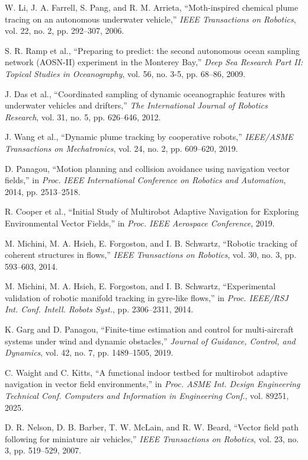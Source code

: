  W. Li, J. A. Farrell, S. Pang, and R. M. Arrieta, ``Moth-inspired chemical plume tracing on an autonomous underwater vehicle,'' \textit{IEEE Transactions on Robotics}, vol. 22, no. 2, pp. 292--307, 2006.

 S. R. Ramp et al., ``Preparing to predict: the second autonomous ocean sampling network (AOSN-II) experiment in the Monterey Bay,'' \textit{Deep Sea Research Part II: Topical Studies in Oceanography}, vol. 56, no. 3-5, pp. 68--86, 2009.

 J. Das et al., ``Coordinated sampling of dynamic oceanographic features with underwater vehicles and drifters,'' \textit{The International Journal of Robotics Research}, vol. 31, no. 5, pp. 626--646, 2012.

 J. Wang et al., ``Dynamic plume tracking by cooperative robots,'' \textit{IEEE/ASME Transactions on Mechatronics}, vol. 24, no. 2, pp. 609--620, 2019.

 D. Panagou, ``Motion planning and collision avoidance using navigation vector fields,'' in \textit{Proc. IEEE International Conference on Robotics and Automation}, 2014, pp. 2513--2518.

 R. Cooper et al., ``Initial Study of Multirobot Adaptive Navigation for Exploring Environmental Vector Fields,'' in \textit{Proc. IEEE Aerospace Conference}, 2019.

 M. Michini, M. A. Hsieh, E. Forgoston, and I. B. Schwartz, ``Robotic tracking of coherent structures in flows,'' \textit{IEEE Transactions on Robotics}, vol. 30, no. 3, pp. 593--603, 2014.

 M. Michini, M. A. Hsieh, E. Forgoston, and I. B. Schwartz, ``Experimental validation of robotic manifold tracking in gyre-like flows,'' in \textit{Proc. IEEE/RSJ Int. Conf. Intell. Robots Syst.}, pp. 2306--2311, 2014.

 K. Garg and D. Panagou, ``Finite-time estimation and control for multi-aircraft systems under wind and dynamic obstacles,'' \textit{Journal of Guidance, Control, and Dynamics}, vol. 42, no. 7, pp. 1489--1505, 2019.

 C. Waight and C. Kitts, ``A functional indoor testbed for multirobot adaptive navigation in vector field environments,'' in \textit{Proc. ASME Int. Design Engineering Technical Conf. Computers and Information in Engineering Conf.}, vol. 89251, 2025.

 D. R. Nelson, D. B. Barber, T. W. McLain, and R. W. Beard, ``Vector field path following for miniature air vehicles,'' \textit{IEEE Transactions on Robotics}, vol. 23, no. 3, pp. 519--529, 2007.

